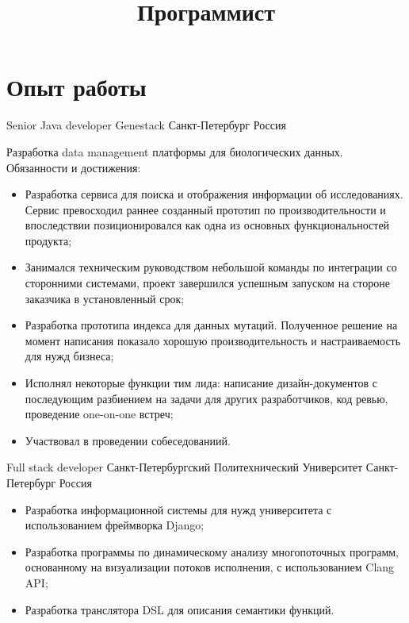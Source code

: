 \documentclass{moderncv}
\title{Программист}
\begin{document}
\makecvtitle

\section{Опыт работы}

        {Senior Java developer}
        {Genestack}
        {Санкт-Петербург}
        {Россия}
        {Разработка data management платформы для биологических данных. \newline{} Обязанности и достижения:
        \begin{itemize}
            \item Разработка сервиса для поиска и отображения информации об исследованиях. 
            Сервис превосходил раннее созданный прототип по производительности и впоследствии 
            позиционировался как одна из основных функциональностей продукта;
            \item Занимался техническим руководством небольшой команды по интеграции со сторонними системами,
            проект завершился успешным запуском на стороне заказчика в установленный срок;
            \item Разработка прототипа индекса для данных мутаций. Полученное решение на момент написания показало
            хорошую производительность и настраиваемость для нужд бизнеса;
            \item Исполнял некоторые функции тим лида: написание дизайн-документов с последующим разбиением на задачи 
            для других разработчиков, код ревью, проведение one-on-one встреч; 
            \item Участвовал в проведении собеседованиий.
        \end{itemize}}

        {Full stack developer}
        {Санкт-Петербургский Политехнический Университет}
        {Санкт-Петербург}
        {Россия}
        {\begin{itemize}
            \item Разработка информационной системы для нужд университета с использованием фреймворка Django;
            \item Разработка программы по динамическому анализу многопоточных программ, основанному на визуализации
            потоков исполнения, с использованием Clang API;
            \item Разработка транслятора DSL для описания семантики функций.
        \end{itemize}}
\end{document}
